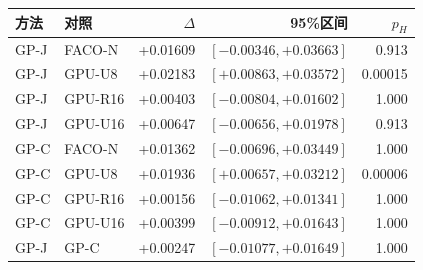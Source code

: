 \begin{tabular}{@{}llrrr@{}}
\toprule
方法 & 对照 & $\Delta$ & 95\%区间 & $p_H$ \\ \midrule
GP-J & FACO-N & +0.01609 & $[-0.00346,+0.03663]$ & 0.913 \\
GP-J & GPU-U8 & +0.02183 & $[+0.00863,+0.03572]$ & 0.00015 \\
GP-J & GPU-R16 & +0.00403 & $[-0.00804,+0.01602]$ & 1.000 \\
GP-J & GPU-U16 & +0.00647 & $[-0.00656,+0.01978]$ & 0.913 \\
GP-C & FACO-N & +0.01362 & $[-0.00696,+0.03449]$ & 1.000 \\
GP-C & GPU-U8 & +0.01936 & $[+0.00657,+0.03212]$ & 0.00006 \\
GP-C & GPU-R16 & +0.00156 & $[-0.01062,+0.01341]$ & 1.000 \\
GP-C & GPU-U16 & +0.00399 & $[-0.00912,+0.01643]$ & 1.000 \\
GP-J & GP-C & +0.00247 & $[-0.01077,+0.01649]$ & 1.000 \\
\bottomrule
\end{tabular}
